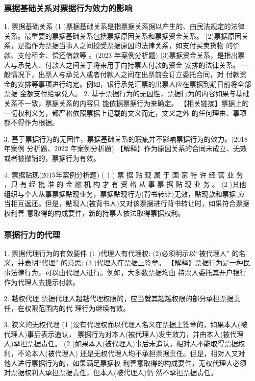 \documentclass[UTF8,12pt]{ctexart}
\numberwithin{equation}{section} %
\numberwithin{figure}{section}
\numberwithin{table}{section}
\begin{document}
	\subsubsection{票据基础关系对票据行为效力的影响} 
	1. 票据基础关系
	(1 )票据基础关系是指票据关系据以产生的、由民法规定的法律关系。最重要的票据基础关系包括票据原因关系和票据资金关系。 (2)票据原因关系，是指作为票据当事人之间授受票据原因的法律关系，如支付买卖货物 的价款、支付租金、偿还借款等 。(2023 年案例分析题) (3)票据资金关系，是指出票人与承兑人、付款人之间关于将来用于向持票人付款的资金 安排的法律关系。 一般情况下，出票人与承兑人或者付款人之间在出票前会订立委托合同，对 付款资金的安排等事项进行约定。例如，银行承兑汇票的出票人应在票据到期日前将全部票据 金额支付给承兑人。
	2. 基于票据行为的无因性，票据行为的内容如果与基础关系不一致，票据关系的内容只 能依据票据行为来确定。
	【相关链接】票据上的 一切权利义务，都严格依照票据上记载的文义而定，文义之外 的任何理由、事项都不得作为根据。
	
	3. 基于票据行为的无因性，票据基础关系的瑕疵并不影响票据行为的效力。(2018年案例 分析题、2022 年案例分析题)
	【解释】作为原因关系的合同未成立、无效或者被撤销的，票据行为有效。
	
	4. 票据贴现(2015年案例分析题)
	( 1 ) 票 据 贴 现 属 于 国 家 特 许 经 营 业 务 ，只 有 经 批 准 的 金 融 机 构 才 有 资 格 从 事 票 据 贴 现 业 务 。 (2 )其他组织与个人从事票据贴现业务，票据贴现行为(背书转让)无效，贴现款和票据 应当相互返还。但是，贴现人(被背书人)又对该票据进行背书转让时，如果符合票据权利善 意取得的构成要件，新的持票人依法取得票据权利。
	
	
	
	\subsubsection{票据行力的代理}
	
	1. 票据代理行为的有效要件
	(1 )代理人有代理权;
	(2)必须明示以“被代理人” 的名义，并表明“代理” 的意思; (3 )代理人在票据上签章。
	【解释】票据行为是一种民事法律行为，可以由代理人进行。例如，大多数票据均由 持票人委托其开户银行作为代理人去提示付款。
	
	2. 越权代理 票据代理人超越代理权限的，应当就其超越权限的部分承担票据责任，在权限范围内的代 理行为继续有效。
	
	
	3. 狭义的无权代理
	(1 )没有代理权而以代理人名义在票据上签章的，如果本人(被代理人)事后表示追认， 票据行为对本人(被代理人)发生效力，并由本人(被代理人)承担票据责任。
	(2 )如果本人(被代理人)事后未追认，相对人不能取得票据权利，不论本人(被代理人) 还是无权代理人均不承担票据责任。但是，相对人又对他人进行票据行为的，如果满足票据权 利善意取得的构成要件，无权代理人必须对票据权利人承担票据责任，但本人(被代理人)仍 然不承担票据责任。
	
\end{document}
